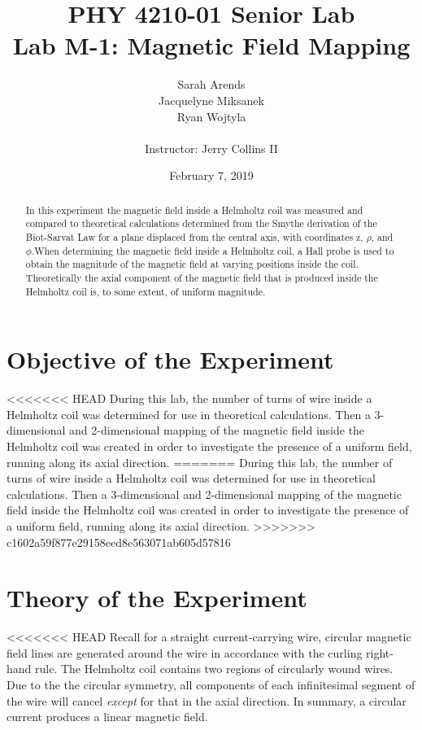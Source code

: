 \documentclass[a4paper]{article}
\title{PHY 4210-01 Senior Lab \\Lab M-1: Magnetic Field Mapping}
\author{Sarah Arends \\ 
        Jacquelyne Miksanek \\
        Ryan Wojtyla \\ \\
        Instructor: Jerry Collins II}
\date{February 7, 2019}
\begin{document}
\maketitle 

\begin{abstract}
  \qq In this experiment the magnetic field inside a Helmholtz coil was measured and
  compared to theoretical calculations determined from the Smythe derivation of
  the Biot-Sarvat Law for a plane displaced from the central axis, with
  coordinates z, $\rho$, and $\phi$.When determining the magnetic field inside a
  Helmholtz coil, a Hall probe is used to obtain the magnitude of the magnetic
  field at varying positions inside the coil. Theoretically the axial component
  of the magnetic field that is produced inside the Helmholtz coil is, to some
  extent, of uniform magnitude.
\end{abstract}

\newpage

\tableofcontents

\newpage

\section{Objective of the Experiment}
<<<<<<< HEAD
During this lab, the number of turns of wire inside a Helmholtz coil
was determined for use in theoretical calculations. Then a
3-dimensional and 2-dimensional mapping of the magnetic field inside
the Helmholtz coil was created in order to investigate the presence of
a uniform field, running along its axial direction.
=======
\qq During this lab, the number of turns of wire inside a Helmholtz coil was
determined for use in theoretical calculations. Then a 3-dimensional and
2-dimensional mapping of the magnetic field inside the Helmholtz coil was
created in order to investigate the presence of a uniform field, running along
its axial direction.
>>>>>>> c1602a59f877e29158eed8e563071ab605d57816

\section{Theory of the Experiment}

<<<<<<< HEAD
Recall for a straight current-carrying wire, circular magnetic field
lines are generated around the wire in accordance with the curling
right-hand rule. The Helmholtz coil contains two regions of circularly
wound wires. Due to the the circular symmetry, all components of each
infinitesimal segment of the wire will cancel \textit{except} for that
in the axial direction. In summary, a circular current produces a
linear magnetic field.
\end{document}
